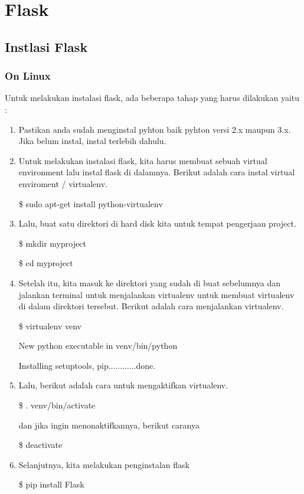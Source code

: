 \documentclass[12pt,a4paper]{article}
\begin{document}
\section{Flask}
\subsection{Instlasi Flask}
\subsubsection{On Linux}
Untuk melakukan instalasi flask, ada beberapa tahap yang harus dilakukan yaitu :
\begin{enumerate}
\item Pastikan anda sudah menginstal pyhton baik pyhton versi 2.x maupun 3.x. Jika belum instal, instal terlebih dahulu.

\item Untuk melakukan instalasi flask, kita harus membuat sebuah virtual environment lalu instal flask di dalamnya. Berikut adalah cara instal virtual enviroment / virtualenv.

\$ sudo apt-get install python-virtualenv

\item Lalu, buat satu direktori di hard disk kita untuk tempat pengerjaan project. 

\$ mkdir myproject

\$ cd myproject

\item Setelah itu, kita masuk ke direktori yang sudah di buat sebelumnya dan jalankan terminal untuk menjalankan virtualenv untuk membuat virtualenv di dalam direktori tersebut. Berikut adalah cara menjalankan virtualenv.

\$ virtualenv venv

New python executable in venv/bin/python

Installing setuptools, pip............done.

\item Lalu, berikut adalah cara untuk mengaktifkan virtualenv.

\$ . venv/bin/activate 

dan jika ingin menonaktifkannya, berikut caranya 

\$ deactivate

\item Selanjutnya, kita melakukan penginstalan flask

\$ pip install Flask
\end{enumerate}
\end{document}
